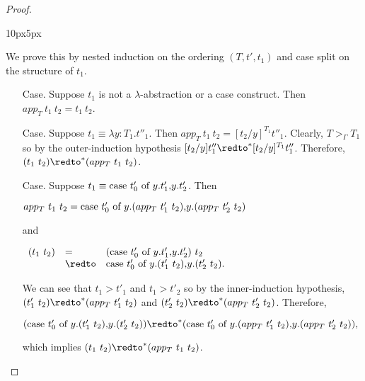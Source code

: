 \begin{proof}
\begin{changemargin}{10px}{5px}
\begin{itemize}
    We prove this by nested induction on the ordering $(T, t', t_1)$ and case split on the
    structure of $t_1$.  
    \begin{itemize}
    \item[Case.] Suppose $t_1$ is not a $\lambda$-abstraction or a case construct.  Then 
      $app_T\ t_1\ t_2 = t_1\ t_2$.
      
    \item[Case.] Suppose $t_1 \equiv \lambda y:T_1.t''_1$.  Then $app_T\ t_1\  t_2 = [t_2/y]^{T_1} t''_1$.
      Clearly, $T >_\Gamma T_1$ so by the outer-induction hypothesis 
      $[t_2/y]t''_1 \redto^* [t_2/y]^{T_1} t''_1$.  Therefore, $(t_1\ t_2) \redto^* (app_T\ t_1\ t_2)$.
      
    \item[Case.] Suppose $t_1 \equiv \mbox{case}\ t'_0\ \text{of}\ y\text{.}t'_1\text{,}y\text{.}t'_2$.  Then 
      \begin{center}
        \begin{math}
          app_T\ t_1\ t_2 = \mbox{case}\ t'_0\ \text{of}\ y\text{.}(app_T\ t'_1\ t_2)\text{,}y\text{.}(app_T\ t'_2\ t_2)
        \end{math}
      \end{center}
      and
      \begin{center}
        \begin{math}
          \begin{array}{lll}
            (t_1\ t_2) & =      & (\ccon{t'_0}{y}{t'_1}{t'_2})\ t_2\\
            & \redto & \ccon{t'_0}{y}{(t'_1\ t_2)}{(t'_2\ t_2)}.
          \end{array}
        \end{math}
      \end{center}
      We can see that $t_1 > t'_1$ and $t_1 > t'_2$ so by the inner-induction hypothesis, $(t'_1\ t_2) \redto^* (app_T\ t'_1\ t_2)$ and
      $(t'_2\ t_2) \redto^* (app_T\ t'_2\ t_2)$.  Therefore, 
      \begin{center}
        \begin{math}
          (\ccon{t'_0}{y}{(t'_1\ t_2)}{(t'_2\ t_2)}) \redto^* (\ccon{t'_0}{y}{(app_T\ t'_1\ t_2)}{(app_T\ t'_2\ t_2)}),
        \end{math}
      \end{center}
      which implies $(t_1\ t_2) \redto^* (app_T\ t_1\ t_2)$.
    \end{itemize} 
  \end{itemize}
  \end{changemargin}
\end{proof}

